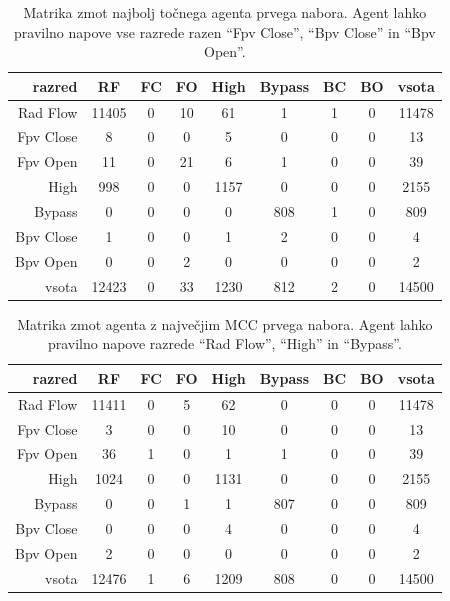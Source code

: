 \begin{table}[H]
    \centering
    \begin{tabular}{||rcccccccc||}
        \hline
        razred    & RF    & FC & FO & High & Bypass & BC & BO & vsota \\ \hline
        Rad Flow  & 11405 & 0  & 10 & 61   & 1      & 1  & 0  & 11478 \\ \hline
        Fpv Close & 8     & 0  & 0  & 5    & 0      & 0  & 0  & 13    \\ \hline
        Fpv Open  & 11    & 0  & 21 & 6    & 1      & 0  & 0  & 39    \\ \hline
        High      & 998   & 0  & 0  & 1157 & 0      & 0  & 0  & 2155  \\ \hline
        Bypass    & 0     & 0  & 0  & 0    & 808    & 1  & 0  & 809   \\ \hline
        Bpv Close & 1     & 0  & 0  & 1    & 2      & 0  & 0  & 4     \\ \hline
        Bpv Open  & 0     & 0  & 2  & 0    & 0      & 0  & 0  & 2     \\ \hline
        vsota     & 12423 & 0  & 33 & 1230 & 812    & 2  & 0  & 14500 \\ \hline
    \end{tabular}
    \caption{Matrika zmot najbolj točnega agenta prvega nabora. Agent lahko pravilno napove vse razrede razen \enquote{Fpv Close}, \enquote{Bpv Close} in \enquote{Bpv Open}.}
    \label{tab:statlog_acc_1}
\end{table}

\begin{table}[H]
    \centering
    \begin{tabular}{||rcccccccc||}
        \hline
        razred    & RF    & FC & FO & High & Bypass & BC & BO & vsota \\ \hline
        Rad Flow  & 11411 & 0  & 5  & 62   & 0      & 0  & 0  & 11478 \\ \hline
        Fpv Close & 3     & 0  & 0  & 10   & 0      & 0  & 0  & 13    \\ \hline
        Fpv Open  & 36    & 1  & 0  & 1    & 1      & 0  & 0  & 39    \\ \hline
        High      & 1024  & 0  & 0  & 1131 & 0      & 0  & 0  & 2155  \\ \hline
        Bypass    & 0     & 0  & 1  & 1    & 807    & 0  & 0  & 809   \\ \hline
        Bpv Close & 0     & 0  & 0  & 4    & 0      & 0  & 0  & 4     \\ \hline
        Bpv Open  & 2     & 0  & 0  & 0    & 0      & 0  & 0  & 2     \\ \hline
        vsota     & 12476 & 1  & 6  & 1209 & 808    & 0  & 0  & 14500 \\ \hline
    \end{tabular}
    \caption{Matrika zmot agenta z največjim MCC prvega nabora. Agent lahko pravilno napove razrede \enquote{Rad Flow}, \enquote{High} in \enquote{Bypass}.}
    \label{tab:statlog_mcc_1}
\end{table}

